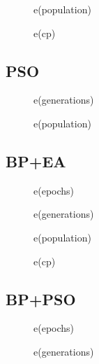 \documentclass[11pt,a4paper,oneside]{report}
\begin{document}
\begin{figure}[H]
	\caption{e(population)}
	
\end{figure}

\begin{figure}[H]
	\caption{e(cp)}
	
\end{figure}

\subsection{PSO}

\begin{figure}[H]
	\caption{e(generations)}
	
\end{figure}

\begin{figure}[H]
	\caption{e(population)}
	
\end{figure}

\subsection{BP+EA}

\begin{figure}[H]
	\caption{e(epochs)}
	
\end{figure}

\begin{figure}[H]
	\caption{e(generations)}
	
\end{figure}

\begin{figure}[H]
	\caption{e(population)}
	
\end{figure}

\begin{figure}[H]
	\caption{e(cp)}
	
\end{figure}

\subsection{BP+PSO}

\begin{figure}[H]
	\caption{e(epochs)}
	
\end{figure}

\begin{figure}[H]
	\caption{e(generations)}
	
\end{figure}
\end{document}
